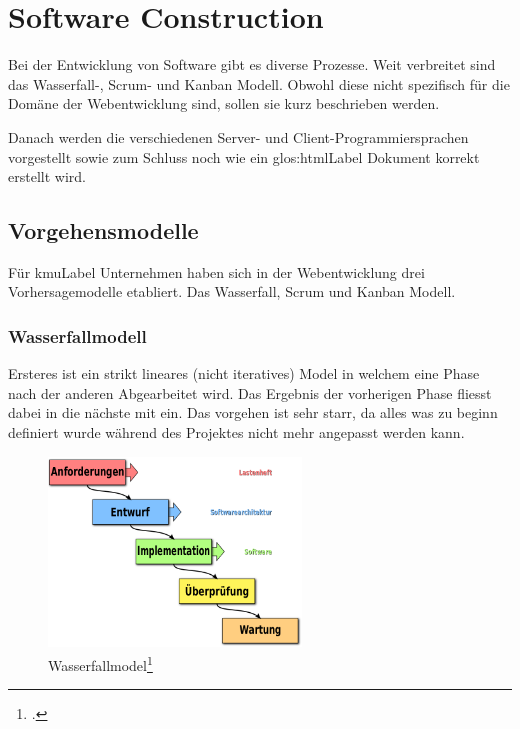 \chapter{Software Construction}

Bei der Entwicklung von Software gibt es diverse Prozesse. Weit verbreitet sind das Wasserfall-, Scrum- und Kanban Modell. Obwohl diese nicht spezifisch für die Domäne der Webentwicklung sind, sollen sie kurz beschrieben werden.

Danach werden die verschiedenen Server- und Client-Programmiersprachen vorgestellt sowie zum Schluss noch wie ein \Gls{glos:htmlLabel} Dokument korrekt erstellt wird.

\section{Vorgehensmodelle}
Für \gls{kmuLabel} Unternehmen haben sich in der Webentwicklung drei Vorhersagemodelle etabliert. Das Wasserfall, Scrum und Kanban Modell. 

\subsection{Wasserfallmodell}
Ersteres ist ein strikt lineares (nicht iteratives) Model in welchem eine Phase nach der anderen Abgearbeitet wird. Das Ergebnis der vorherigen Phase fliesst dabei in die nächste mit ein. Das vorgehen ist sehr starr, da alles was zu beginn definiert wurde während des Projektes nicht mehr angepasst werden kann.

\begin{figure}[H]
  \centering
  \includegraphics[width=0.6\textwidth]{images/wasserfall.png}
  \caption{Wasserfallmodel\footcite{Waterfall_model-de_-_Wasserfallmodell__Wikipedia_2015-06-03}}
  \label{fig:softwareconstruction:vorgehensmodelle:wasserfall}
\end{figure}

